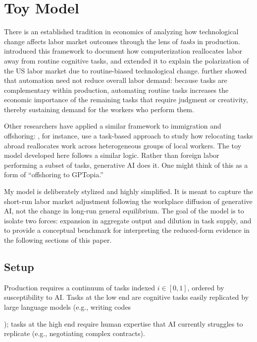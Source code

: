\documentclass[11pt]{article}
\theoremstyle{plain}
\theoremstyle{remark}
\begin{document}
\section{Toy Model}
\label{sec:model}
There is an established tradition in economics of analyzing how technological change affects labor market outcomes through the lens of \textit{tasks} in production. \textcite{autor2003skill} introduced this framework to document how computerization reallocates labor away from routine cognitive tasks, and \textcite{autor2013growth} extended it to explain the polarization of the US labor market due to routine-biased technological change. 
\textcite{autor2015whyjobs} further showed that automation need not reduce overall labor demand: because tasks are complementary within production, automating routine tasks increases the economic importance of the remaining tasks that require judgment or creativity, thereby sustaining demand for the workers who perform them.

Other researchers have applied a similar framework to immigration and offshoring: \textcite{ottaviano2013immigration}, for instance, use a task-based approach to study how relocating tasks abroad reallocates work across heterogeneous groups of local workers. The toy model developed here follows a similar logic. Rather than foreign labor performing a subset of tasks, generative AI does it. One might think of this as a form of ``offshoring to GPTopia.''

My model is deliberately stylized and highly simplified. It is meant to capture the short-run labor market adjustment following the workplace diffusion of generative AI, not the change in long-run general equilibrium. The goal of the model is to isolate two forces: expansion in aggregate output and dilution in task supply, and to provide a conceptual benchmark for interpreting the reduced-form evidence in the following sections of this paper.


\subsection{Setup}

Production requires a continuum of tasks indexed $i \in [0,1]$, ordered by susceptibility to AI. Tasks at the low end are cognitive tasks easily replicated by large language models (e.g., writing codes

); tasks at the high end require human expertise that AI currently struggles to replicate (e.g., negotiating complex contracts).
\end{document}
